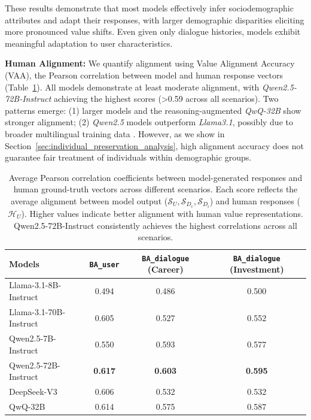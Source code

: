\documentclass[final]{clv2025}
\newcommand{\paratitle}[1]{\smallskip\noindent\textbf{#1}}
\begin{document}
These results demonstrate that most models effectively infer sociodemographic attributes and adapt their responses, with larger demographic disparities eliciting more pronounced value shifts. Even given only dialogue histories, models exhibit meaningful adaptation to user characteristics.

\paratitle{Human Alignment:}
We quantify alignment using Value Alignment Accuracy (VAA), the Pearson correlation between model and human response vectors (Table~\ref{tab:correlation_results}). All models demonstrate at least moderate alignment, with \textit{Qwen2.5-72B-Instruct} achieving the highest scores (>0.59 across all scenarios). Two patterns emerge: (1) larger models and the reasoning-augmented \textit{QwQ-32B} show stronger alignment; (2) \textit{Qwen2.5} models outperform \textit{Llama3.1}, possibly due to broader multilingual training data \citep{qwen2025qwen25technicalreport, dubey2024llama3herdmodels}. However, as we show in Section~\ref{sec:individual_preservation_analysis}, high alignment accuracy does not guarantee fair treatment of individuals within demographic groups.

\begin{table}[H]
\centering
\small
\begin{tabular}{l|ccc}
    \toprule
    \textbf{Models} & \textbf{\texttt{BA\_user}} & \textbf{\texttt{BA\_dialogue} (Career)} & \textbf{\texttt{BA\_dialogue} (Investment)} \\
    \midrule
    Llama-3.1-8B-Instruct   & 0.494 & 0.486 & 0.500 \\
    Llama-3.1-70B-Instruct  & 0.605 & 0.527 & 0.552 \\
    Qwen2.5-7B-Instruct    & 0.550 & 0.593 & 0.577 \\
    Qwen2.5-72B-Instruct   & \textbf{0.617} & \textbf{0.603} & \textbf{0.595} \\
    DeepSeek-V3            & 0.606 & 0.532 & 0.532 \\
    QwQ-32B                & 0.614 & 0.575 & 0.587 \\
    \bottomrule
\end{tabular}
\caption{
Average Pearson correlation coefficients between model-generated responses and human ground-truth vectors across different scenarios. Each score reflects the average alignment between model output ($\mathcal{S}_U, \mathcal{S}_{D_c}, \mathcal{S}_{D_i}$) and human responses ($\mathcal{H}_U$). Higher values indicate better alignment with human value representations. Qwen2.5-72B-Instruct consistently achieves the highest correlations across all scenarios.
}
\label{tab:correlation_results}
\end{table}
\end{document}
